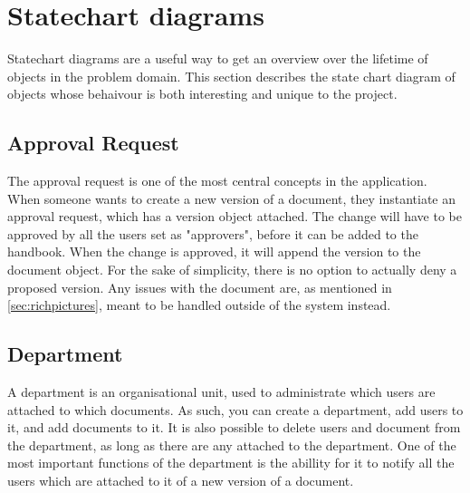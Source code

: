 \section{Statechart diagrams} \label{sec:statechart}
Statechart diagrams are a useful way to get an overview over the lifetime of objects in the problem domain.
This section describes the state chart diagram of objects whose behaivour is both interesting and unique to the project.

\subsection{Approval Request}
The approval request is one of the most central concepts in the application.
When someone wants to create a new version of a document, they instantiate an approval request, which has a version object attached.
The change will have to be approved by all the users set as "approvers", before it can be added to the handbook.
When the change is approved, it will append the version to the document object.
For the sake of simplicity, there is no option to actually deny a proposed version.
Any issues with the document are, as mentioned in \cref{sec:richpictures}, meant to be handled outside of the system instead.


\subsection{Department}
A department is an organisational unit, used to administrate which users are attached to which documents.
As such, you can create a department, add users to it, and add documents to it.
It is also possible to delete users and document from the department, as long as there are any attached to the department.
One of the most important functions of the department is the abillity for it to notify all the users which are attached to it of a new version of a document.

